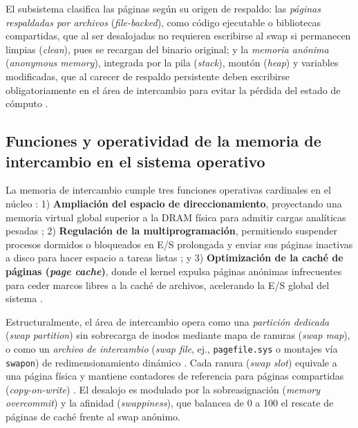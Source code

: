 \documentclass[12pt]{article}
\begin{document}
El subsistema clasifica las páginas según su origen de respaldo: las \textit{páginas respaldadas por archivos} (\textit{file-backed}), como código ejecutable o bibliotecas compartidas, que al ser desalojadas no requieren escribirse al swap si permanecen limpias (\textit{clean}), pues se recargan del binario original; y la \textit{memoria anónima} (\textit{anonymous memory}), integrada por la pila (\textit{stack}), montón (\textit{heap}) y variables modificadas, que al carecer de respaldo persistente deben escribirse obligatoriamente en el área de intercambio para evitar la pérdida del estado de cómputo \parencite[\S 12.4, p.\ 415]{silberschatz2006fundamentos}.

\subsection{Funciones y operatividad de la memoria de intercambio en el sistema operativo}

La memoria de intercambio cumple tres funciones operativas cardinales en el núcleo \parencite[\S 8.1, p.\ 371]{stallings2018operating}: 1) \textbf{Ampliación del espacio de direccionamiento}, proyectando una memoria virtual global superior a la DRAM física para admitir cargas analíticas pesadas \parencite[\S 10.3, p.\ 432]{deitel2004operating}; 2) \textbf{Regulación de la multiprogramación}, permitiendo suspender procesos dormidos o bloqueados en E/S prolongada y enviar sus páginas inactivas a disco para hacer espacio a tareas listas \parencite[\S 3.2, p.\ 136]{stallings2018operating}; y 3) \textbf{Optimización de la caché de páginas (\textit{page cache})}, donde el kernel expulsa páginas anónimas infrecuentes para ceder marcos libres a la caché de archivos, acelerando la E/S global del sistema \parencite[\S 4.9, p.\ 181]{carretero2001sistemas}.

Estructuralmente, el área de intercambio opera como una \textit{partición dedicada} (\textit{swap partition}) sin sobrecarga de inodos mediante mapa de ranuras (\textit{swap map}), o como un \textit{archivo de intercambio} (\textit{swap file}, ej., \texttt{pagefile.sys} o montajes vía \texttt{swapon}) de redimensionamiento dinámico \parencite[\S 12.4, p.\ 416]{silberschatz2006fundamentos}. Cada ranura (\textit{swap slot}) equivale a una página física y mantiene contadores de referencia para páginas compartidas (\textit{copy-on-write}) \parencite[\S 9.3, p.\ 289]{silberschatz2006fundamentos}. El desalojo es modulado por la sobreasignación (\textit{memory overcommit}) y la afinidad (\textit{swappiness}), que balancea de 0 a 100 el rescate de páginas de caché frente al swap anónimo.
\end{document}
